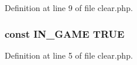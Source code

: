 Definition at line 9 of file clear.\+php.

\hypertarget{clear_8php_a12c82f3d28569a3f80804f1e72cef14c}{
\subsubsection[{I\+N\+\_\+\+G\+A\+M\+E}]{\setlength{\rightskip}{0pt plus 5cm}const I\+N\+\_\+\+G\+A\+M\+E T\+R\+U\+E}}\label{clear_8php_a12c82f3d28569a3f80804f1e72cef14c}


Definition at line 5 of file clear.\+php.

